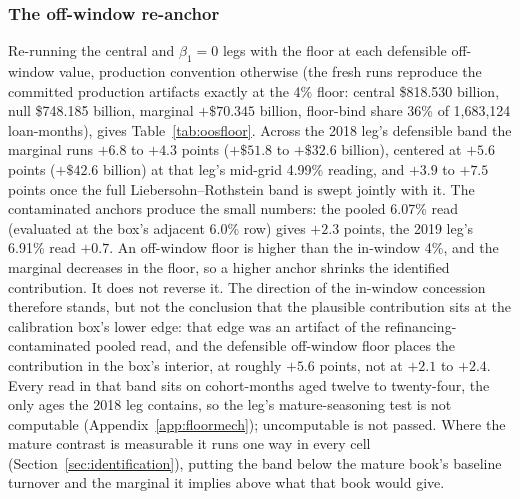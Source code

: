 \documentclass[12pt]{article}
\begin{document}
\subsubsection{The off-window re-anchor}

Re-running the central and $\beta_1 = 0$ legs with the floor at each defensible off-window value, production convention otherwise (the fresh runs reproduce the committed production artifacts exactly at the 4\% floor: central \$818.530 billion, null \$748.185 billion, marginal $+\$70.345$ billion, floor-bind share 36\% of 1,683,124 loan-months), gives Table~\ref{tab:oosfloor}. Across the 2018 leg's defensible band the marginal runs $+6.8$ to $+4.3$ points ($+\$51.8$ to $+\$32.6$ billion), centered at $+5.6$ points ($+\$42.6$ billion) at that leg's mid-grid 4.99\% reading, and $+3.9$ to $+7.5$ points once the full Liebersohn--Rothstein band is swept jointly with it. The contaminated anchors produce the small numbers: the pooled 6.07\% read (evaluated at the box's adjacent 6.0\% row) gives $+2.3$ points, the 2019 leg's 6.91\% read $+0.7$. An off-window floor is higher than the in-window 4\%, and the marginal decreases in the floor, so a higher anchor shrinks the identified contribution. It does not reverse it. The direction of the in-window concession therefore stands, but not the conclusion that the plausible contribution sits at the calibration box's lower edge: that edge was an artifact of the refinancing-contaminated pooled read, and the defensible off-window floor places the contribution in the box's interior, at roughly $+5.6$ points, not at $+2.1$ to $+2.4$. Every read in that band sits on cohort-months aged twelve to twenty-four, the only ages the 2018 leg contains, so the leg's mature-seasoning test is not computable (Appendix~\ref{app:floormech}); uncomputable is not passed. Where the mature contrast is measurable it runs one way in every cell (Section~\ref{sec:identification}), putting the band below the mature book's baseline turnover and the marginal it implies above what that book would give.
\end{document}
